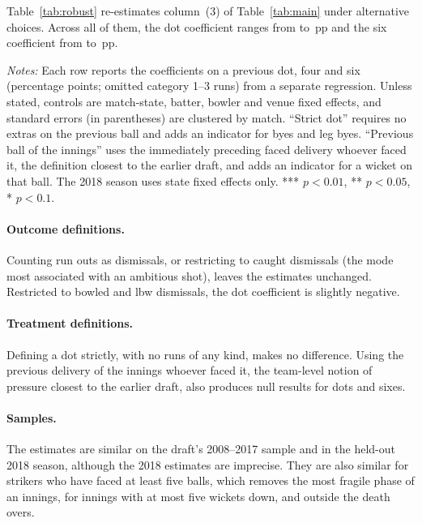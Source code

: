 \documentclass[11pt]{article}
\newcommand{\pp}{\,pp}
\begin{document}
Table~\ref{tab:robust} re-estimates column~(3) of Table~\ref{tab:main} under \RobRows{} alternative choices. Across all of them, the dot coefficient ranges from \RobDotMin{} to \RobDotMax\pp{} and the six coefficient from \RobSixMin{} to \RobSixMax\pp.

\begin{table}[tbp]
\centering
\begin{threeparttable}
\caption{Robustness of the dismissal estimates}\label{tab:robust}
\footnotesize
\setlength{\tabcolsep}{4pt}

\begin{tablenotes}[flushleft]\footnotesize
\item \emph{Notes:} Each row reports the coefficients on a previous dot, four and six (percentage points; omitted category 1--3 runs) from a separate regression. Unless stated, controls are match-state, batter, bowler and venue fixed effects, and standard errors (in parentheses) are clustered by match. ``Strict dot'' requires no extras on the previous ball and adds an indicator for byes and leg byes. ``Previous ball of the innings'' uses the immediately preceding faced delivery whoever faced it, the definition closest to the earlier draft, and adds an indicator for a wicket on that ball. The 2018 season uses state fixed effects only. *** $p<0.01$, ** $p<0.05$, * $p<0.1$.
\end{tablenotes}
\end{threeparttable}
\end{table}

\paragraph{Outcome definitions.} Counting run outs as dismissals, or restricting to caught dismissals (the mode most associated with an ambitious shot), leaves the estimates unchanged. Restricted to bowled and lbw dismissals, the dot coefficient is slightly negative.

\paragraph{Treatment definitions.} Defining a dot strictly, with no runs of any kind, makes no difference. Using the previous delivery of the innings whoever faced it, the team-level notion of pressure closest to the earlier draft, also produces null results for dots and sixes.

\paragraph{Samples.} The estimates are similar on the draft's 2008--2017 sample and in the held-out 2018 season, although the 2018 estimates are imprecise. They are also similar for strikers who have faced at least five balls, which removes the most fragile phase of an innings, for innings with at most five wickets down, and outside the death overs.
\end{document}
